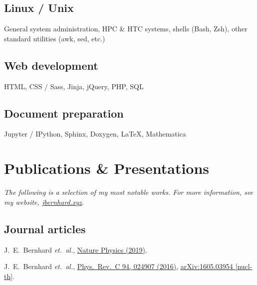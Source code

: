 \documentclass[letterpaper,10pt]{article}
\begin{document}
\begin{multicols}{2}
\subsection{Linux / Unix}

General system administration, HPC \& HTC systems, shells (Bash, Zsh), other standard utilities (awk, sed, etc.)

\subsection{Web development}

HTML, CSS / Sass, Jinja, jQuery, PHP, SQL

\subsection{Document preparation}

Jupyter / IPython, Sphinx, Doxygen, \LaTeX, Mathematica



\section{Publications \& Presentations}

\vspace{-.5\parskip}
\emph{%
  \small
  The following is a selection of my most notable works.
  For more information, see my website, \href{https://jbernhard.xyz}{jbernhard.xyz}.
}
\vspace{-.5\parskip}



\subsection{Journal articles}

J.~E.~Bernhard \textit{et.\ al.},
\href{https://www.nature.com/articles/s41567-019-0611-8}{Nature Physics (2019)}.

J.~E.~Bernhard \textit{et.\ al.},
\href{https://journals.aps.org/prc/abstract/10.1103/PhysRevC.94.024907}{Phys.\ Rev.\ C 94, 024907 (2016)},
\href{https://arxiv.org/abs/1605.03954}{arXiv:1605.03954 [nucl-th]}.


\end{multicols}
\end{document}

